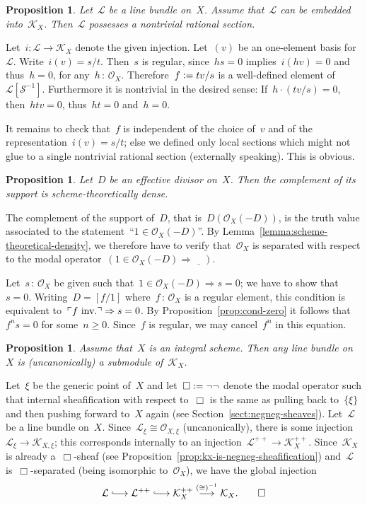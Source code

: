 \documentclass[10pt,reqno,a4paper]{amsbook}
\makeatletter
\theoremstyle{definition}
\theoremstyle{plain}
\newtheorem{prop}[defn]{Proposition}
\theoremstyle{remark}
\renewcommand{\O}{\mathcal{O}}
\newcommand{\K}{\mathcal{K}}
\renewcommand{\L}{\mathcal{L}}
\renewcommand{\S}{\mathcal{S}}
\newcommand{\placeholder}{\underline{\quad}}
\newcommand{\?}{\,{:}\,}
\renewcommand{\_}{\mathpunct{.}\,}
\newcommand{\speak}[1]{\ulcorner\text{\textnormal{#1}}\urcorner}
\newcommand{\lhra}{\ensuremath{\lhook\joinrel\relbar\joinrel\rightarrow}}
\newcommand{\inv}{inv.\@}
\newcommand{\defeq}{\vcentcolon=}
\renewenvironment{proof}[1][\proofname]{\par
  \pushQED{\qed}%
  \normalfont \topsep6\p@\@plus6\p@\relax
  \trivlist
  \item[\hskip\labelsep
        \itshape
    #1\@addpunct{.}]\ignorespaces
}{%
  \popQED\endtrivlist\@endpefalse
}
\makeatother
\begin{document}
\begin{prop}Let~$\L$ be a line bundle on~$X$. Assume that~$\L$ can be embedded
into~$\K_X$. Then~$\L$ possesses a nontrivial rational section.
\end{prop}
\begin{proof}Let~$i : \L \to \K_X$ denote the given injection. Let~$(v)$ be an
one-element basis for~$\L$. Write~$i(v) = s/t$. Then~$s$ is regular,
since~$hs = 0$ implies~$i(hv) = 0$ and thus~$h = 0$, for any~$h\?\O_X$.
Therefore~$f \defeq tv/s$ is a well-defined element of~$\L[\S^{-1}]$.
Furthermore it is nontrivial in the desired sense: If~$h \cdot (tv/s) = 0$,
then~$htv = 0$, thus~$ht = 0$ and~$h = 0$.

It remains to check that~$f$ is independent of the choice of~$v$ and of the
representation~$i(v) = s/t$; else we defined only local sections which might not
glue to a single nontrivial rational section (externally speaking). This is
obvious.
\end{proof}

\begin{prop}Let~$D$ be an effective divisor on~$X$. Then the complement of its
support is scheme-theoretically dense.\end{prop}
\begin{proof}The complement of the support of~$D$, that is~$D(\O_X(-D))$, is
the truth value associated to the statement~``$1 \in \O_X(-D)$''. By
Lemma~\ref{lemma:scheme-theoretical-density}, we therefore have to verify
that~$\O_X$ is separated with respect to the modal operator~$(1 \in \O_X(-D)
\Rightarrow \placeholder)$.

Let~$s \? \O_X$ be given such that~$1 \in \O_X(-D) \Rightarrow s = 0$; we have
to show that~$s = 0$. Writing~$D = [f/1]$ where~$f \? \O_X$ is a regular
element, this condition is equivalent to~$\speak{$f$ \inv} \Rightarrow s = 0$.
By Proposition~\ref{prop:cond-zero} it follows that~$f^n s = 0$ for some~$n
\geq 0$. Since~$f$ is regular, we may cancel~$f^n$ in this equation.
\end{proof}

\begin{prop}Assume that~$X$ is an integral scheme. Then any line bundle on~$X$
is (uncanonically) a submodule of~$\K_X$.\end{prop}
\begin{proof}Let~$\xi$ be the generic point of~$X$ and let~$\Box \defeq \neg\neg$
denote the modal operator such that internal sheafification with respect
to~$\Box$ is the same as pulling back to~$\{\xi\}$ and then pushing forward
to~$X$ again (see Section~\ref{sect:negneg-sheaves}). Let~$\L$ be a line bundle on~$X$. Since~$\L_\xi \cong
\O_{X,\xi}$ (uncanonically), there is some injection~$\L_\xi \to \K_{X,\xi}$;
this corresponds internally to an injection~$\L^{++} \to \K_X^{++}$.
Since~$\K_X$ is already a~$\Box$-sheaf (see
Proposition~\ref{prop:kx-is-negneg-sheafification}) and~$\L$ is~$\Box$-separated
(being isomorphic to~$\O_X$), we have the global injection
\[ \L \lhra \L^{++} \lhra \K_X^{++} \stackrel{({\cong})^{-1}}{\longrightarrow} \K_X. \qedhere \]
\end{proof}
\end{document}
